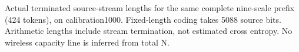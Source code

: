 Actual terminated source-stream lengths for the same complete nine-scale prefix (424 tokens), on calibration1000. Fixed-length coding takes 5088 source bits. Arithmetic lengths include stream termination, not estimated cross entropy. No wireless capacity line is inferred from total N.
